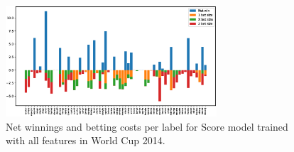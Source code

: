 \begin{figure}[H]
    \centering
    \includegraphics[width=0.7\textwidth]{img/match_level_2014_score_win_cost_.eps}
    \caption{Net winnings and betting costs per label for Score model trained with all features in World Cup 2014.}
    \label{fig:net_win_cost_2014}
\end{figure}